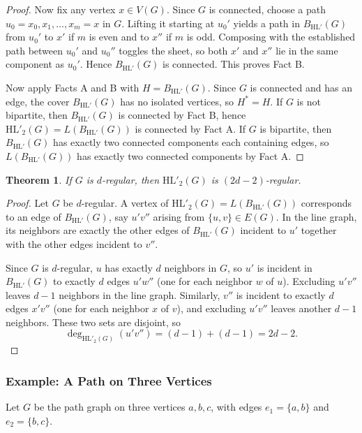 \documentclass[11pt]{article}
\newtheorem{theorem}{Theorem}
\newcommand{\HL}{\mathrm{HL}}
\theoremstyle{plain}
\begin{document}
\begin{proof}
Now fix any vertex \(x\in V(G)\). Since \(G\) is connected, choose a path
\(u_0=x_0,x_1,\dots,x_m=x\) in \(G\). Lifting it starting at \(u_0'\) yields a
path in \(B_{\HL'}(G)\) from \(u_0'\) to \(x'\) if \(m\) is even and to \(x''\)
if \(m\) is odd. Composing with the established path between \(u_0'\) and
\(u_0''\) toggles the sheet, so both \(x'\) and \(x''\) lie in the same
component as \(u_0'\). Hence \(B_{\HL'}(G)\) is connected. This proves Fact B.

\medskip
Now apply Facts A and B with \(H=B_{\HL'}(G)\). Since \(G\) is connected and has
an edge, the cover \(B_{\HL'}(G)\) has no isolated vertices, so \(H^\ast=H\).
If \(G\) is not bipartite, then \(B_{\HL'}(G)\) is connected by Fact B, hence
\(\HL'_2(G)=L(B_{\HL'}(G))\) is connected by Fact A. If \(G\) is bipartite, then
\(B_{\HL'}(G)\) has exactly two connected components each containing edges, so
\(L(B_{\HL'}(G))\) has exactly two connected components by Fact A.
\end{proof}


\begin{theorem}\label{thm:symmetric-regularity}
If \( G \) is \( d \)-regular, then \( \mathrm{HL}'_2(G) \) is \( (2d - 2) \)-regular.
\end{theorem}

\begin{proof}
Let $G$ be $d$-regular. A vertex of $\HL'_2(G)=L(B_{\HL'}(G))$ corresponds to
an edge of $B_{\HL'}(G)$, say $u'v''$ arising from $\{u,v\}\in E(G)$.
In the line graph, its neighbors are exactly the other edges of $B_{\HL'}(G)$
incident to $u'$ together with the other edges incident to $v''$.

Since $G$ is $d$-regular, $u$ has exactly $d$ neighbors in $G$, so $u'$ is
incident in $B_{\HL'}(G)$ to exactly $d$ edges $u'w''$ (one for each neighbor
$w$ of $u$). Excluding $u'v''$ leaves $d-1$ neighbors in the line graph.
Similarly, $v''$ is incident to exactly $d$ edges $x'v''$ (one for each neighbor
$x$ of $v$), and excluding $u'v''$ leaves another $d-1$ neighbors. These two
sets are disjoint, so
\[
\deg_{\HL'_2(G)}(u'v'')=(d-1)+(d-1)=2d-2.
\]
\end{proof}


\subsubsection{Example: A Path on Three Vertices}
Let $G$ be the path graph on three vertices $a, b, c$, with edges $e_1 = \{a,b\}$ and $e_2 = \{b,c\}$.
\end{document}
